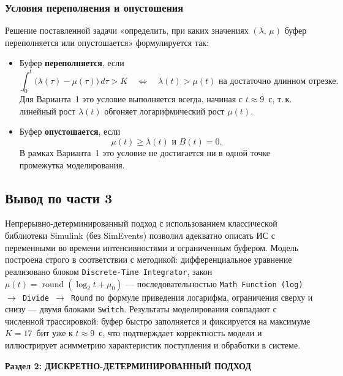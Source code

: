 \documentclass[a4paper,12pt]{article}
\begin{document}
\subsubsection*{Условия переполнения и опустошения}
Решение поставленной задачи «определить, при каких значениях
$(\lambda,\,\mu)$ буфер переполняется или опустошается» формулируется так:

\begin{itemize}
    \item Буфер \textbf{переполняется}, если
    \[
        \int_{0}^{t}\bigl(\lambda(\tau)-\mu(\tau)\bigr)\,d\tau > K
        \quad \Leftrightarrow \quad
        \lambda(t) > \mu(t) \text{ на достаточно длинном отрезке.}
    \]
    Для Варианта~1 это условие выполняется всегда, начиная с $t \approx 9$~с, т.\,к.
    линейный рост $\lambda(t)$ обгоняет логарифмический рост $\mu(t)$.
    \item Буфер \textbf{опустошается}, если
    \[
        \mu(t) \geqslant \lambda(t) \text{ и } B(t)=0.
    \]
    В рамках Варианта~1 это условие не достигается ни в одной точке промежутка
    моделирования.
\end{itemize}

\subsection*{Вывод по части 3}
Непрерывно-детерминированный подход с использованием классической библиотеки Simulink
(без SimEvents) позволил адекватно описать ИС с переменными во времени интенсивностями
и ограниченным буфером. Модель построена строго в соответствии с методикой:
дифференциальное уравнение реализовано блоком \texttt{Discrete-Time Integrator},
закон $\mu(t)=\operatorname{round}(\log_{2}t+\mu_{0})$ --- последовательностью
\texttt{Math Function~(log) $\rightarrow$ Divide $\rightarrow$ Round} по формуле
приведения логарифма, ограничения сверху и снизу --- двумя блоками \texttt{Switch}.
Результаты моделирования совпадают с численной трассировкой: буфер быстро
заполняется и фиксируется на максимуме $K=17$~бит уже к $t\approx 9$~с,
что подтверждает корректность модели и иллюстрирует асимметрию характеристик
поступления и обработки в системе.



\newpage
\begin{center}
    {\Large \textbf{Раздел 2: ДИСКРЕТНО-ДЕТЕРМИНИРОВАННЫЙ ПОДХОД}}
\end{center}
\vspace{10mm}
\end{document}
